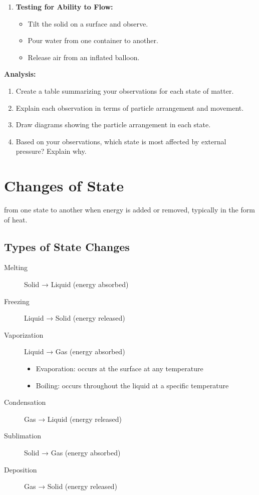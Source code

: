 \documentclass[justified,notoc]{tufte-book}
\newenvironment{investigation}[1]{%
    \begin{tcolorbox}[colback=info!10,colframe=info,title=\textbf{Investigation: #1}]
}{%
    \end{tcolorbox}
}
\newenvironment{keyconcept}[1]{%
    \begin{tcolorbox}[colback=primary!5,colframe=primary,title=\textbf{Key Concept: #1}]
}{%
    \end{tcolorbox}
}
\begin{document}
\begin{investigation}{Comparing Properties of States of Matter}
\begin{enumerate}
    \item \textbf{Testing for Ability to Flow:}
    \begin{itemize}
        \item Tilt the solid on a surface and observe.
        \item Pour water from one container to another.
        \item Release air from an inflated balloon.
    \end{itemize}
\end{enumerate}

\textbf{Analysis:}
\begin{enumerate}
    \item Create a table summarizing your observations for each state of matter.
    \item Explain each observation in terms of particle arrangement and movement.
    \item Draw diagrams showing the particle arrangement in each state.
    \item Based on your observations, which state is most affected by external pressure? Explain why.
\end{enumerate}
\end{investigation}

\section{Changes of State}

 from one state to another when energy is added or removed, typically in the form of heat.

\subsection{Types of State Changes}

\begin{keyconcept}{Changes of State}
\begin{description}
    \item[Melting] Solid → Liquid (energy absorbed)
    \item[Freezing] Liquid → Solid (energy released)
    \item[Vaporization] Liquid → Gas (energy absorbed)
    \begin{itemize}
        \item Evaporation: occurs at the surface at any temperature
        \item Boiling: occurs throughout the liquid at a specific temperature
    \end{itemize}
    \item[Condensation] Gas → Liquid (energy released)
    \item[Sublimation] Solid → Gas (energy absorbed)
    \item[Deposition] Gas → Solid (energy released)
\end{description}
\end{keyconcept}
\end{document}
